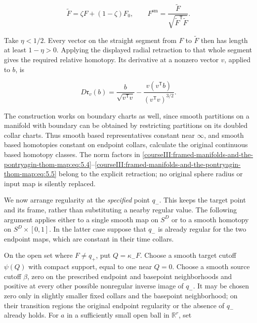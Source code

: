 \begin{equation}
\widetilde F=\zeta F+(1-\zeta)F_0,\qquad
 F^{\mathrm{sm}}=\frac{\widetilde F}
                       {\sqrt{\widetilde F^{\mathsf T}\widetilde F}}.
 \label{courseIII:framed-manifolds-and-the-pontryagin-thom-map:eq:5.4}
\end{equation}

Take \(\eta<1/2\). Every vector on the straight segment from \(F\) to \(\widetilde F\) then has length at least \(1-\eta>0\). Applying the displayed radial retraction to that whole segment gives the required relative homotopy. Its derivative at a nonzero vector \(v\), applied to \(b\), is

\begin{equation}
D\mathfrak r_v(b)=\frac{b}{\sqrt{v^{\mathsf T}v}}
       -\frac{v(v^{\mathsf T}b)}{(v^{\mathsf T}v)^{3/2}}.
 \label{courseIII:framed-manifolds-and-the-pontryagin-thom-map:eq:5.5}
\end{equation}

The construction works on boundary charts as well, since smooth partitions on a manifold with boundary can be obtained by restricting partitions on its doubled collar charts. Thus smooth based representatives constant near \(\infty\), and smooth based homotopies constant on endpoint collars, calculate the original continuous based homotopy classes. The norm factors in \eqref{courseIII:framed-manifolds-and-the-pontryagin-thom-map:eq:5.4}--\eqref{courseIII:framed-manifolds-and-the-pontryagin-thom-map:eq:5.5} belong to the explicit retraction; no original sphere radius or input map is silently replaced.

We now arrange regularity at the \emph{specified} point \(q_-\). This keeps the target point and its frame, rather than substituting a nearby regular value. The following argument applies either to a single smooth map on \(S^D\) or to a smooth homotopy on \(S^D\times[0,1]\). In the latter case suppose that \(q_-\) is already regular for the two endpoint maps, which are constant in their time collars.

On the open set where \(F\ne q_+\), put \(Q=\kappa_-F\). Choose a smooth target cutoff \(\psi(Q)\) with compact support, equal to one near \(Q=0\). Choose a smooth source cutoff \(\beta\), zero on the prescribed endpoint and basepoint neighborhoods and positive at every other possible nonregular inverse image of \(q_-\). It may be chosen zero only in slightly smaller fixed collars and the basepoint neighborhood; on their transition regions the original endpoint regularity or the absence of \(q_-\) already holds. For \(a\) in a sufficiently small open ball in \(\mathbb R^r\), set

